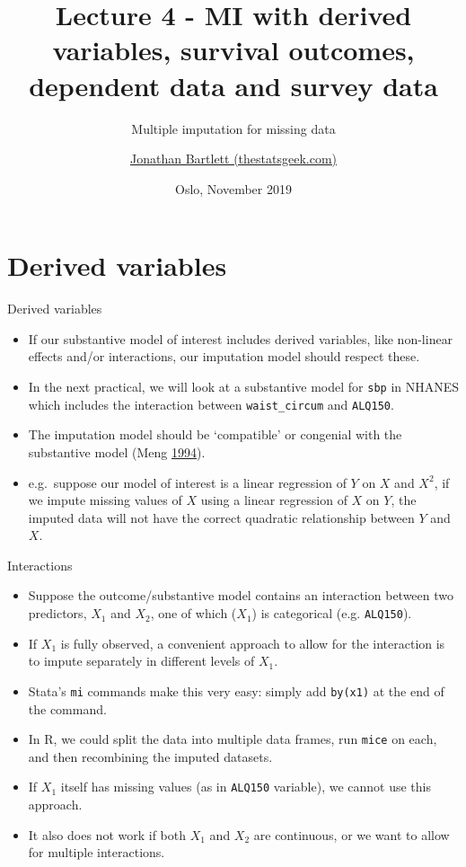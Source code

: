 \documentclass[ignorenonframetext,]{beamer}
\title{Lecture 4 - MI with derived variables, survival outcomes, dependent data
and survey data}
\subtitle{Multiple imputation for missing data}
\author{\href{https://thestatsgeek.com}{Jonathan Bartlett (thestatsgeek.com)}}
\date{Oslo, November 2019}
\providecommand{\tightlist}{%
  \setlength{\itemsep}{0pt}\setlength{\parskip}{0pt}}
\begin{document}
\frame{\titlepage}

\begin{frame}
\tableofcontents[hideallsubsections]
\end{frame}
\hypertarget{derived-variables}{%
\section{Derived variables}\label{derived-variables}}

\begin{frame}[fragile]{Derived variables}
\protect\hypertarget{derived-variables-1}{}

\begin{itemize}
\tightlist
\item
  If our substantive model of interest includes derived variables, like
  non-linear effects and/or interactions, our imputation model should
  respect these.
\item
  In the next practical, we will look at a substantive model for
  \texttt{sbp} in NHANES which includes the interaction between
  \texttt{waist\_circum} and \texttt{ALQ150}.
\item
  The imputation model should be `compatible' or congenial with the
  substantive model (Meng \protect\hyperlink{ref-Meng:1994}{1994}).
\item
  e.g.~suppose our model of interest is a linear regression of \(Y\) on
  \(X\) and \(X^2\), if we impute missing values of \(X\) using a linear
  regression of \(X\) on \(Y\), the imputed data will not have the
  correct quadratic relationship between \(Y\) and \(X\).
\end{itemize}

\end{frame}

\begin{frame}[fragile]{Interactions}
\protect\hypertarget{interactions}{}

\begin{itemize}
\tightlist
\item
  Suppose the outcome/substantive model contains an interaction between
  two predictors, \(X_{1}\) and \(X_{2}\), one of which (\(X_{1}\)) is
  categorical (e.g. \texttt{ALQ150}).
\item
  If \(X_{1}\) is fully observed, a convenient approach to allow for the
  interaction is to impute separately in different levels of \(X_{1}\).
\item
  Stata's \texttt{mi} commands make this very easy: simply add
  \texttt{by(x1)} at the end of the command.
\item
  In R, we could split the data into multiple data frames, run
  \texttt{mice} on each, and then recombining the imputed datasets.
\item
  If \(X_{1}\) itself has missing values (as in \texttt{ALQ150}
  variable), we cannot use this approach.
\item
  It also does not work if both \(X_{1}\) and \(X_{2}\) are continuous,
  or we want to allow for multiple interactions.
\end{itemize}

\end{frame}
\end{document}
